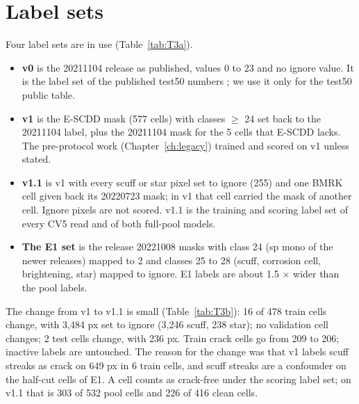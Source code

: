 
\section{Label sets}\label{sec:data-labels}

Four label sets are in use (Table~\ref{tab:T3a}).
\begin{itemize}
  \item \textbf{v0} is the 20211104 release as published, values 0 to 23 and no ignore value. It is the label set of the published
    test50 numbers \citep{pratt2023benchmark}; we use it only for the test50 public table.
  \item \textbf{v1} is the E-SCDD mask (577 cells) with classes $\geq$ 24 set back to the 20211104 label, plus the 20211104 mask for the 5
    cells that E-SCDD lacks. The pre-protocol work (Chapter~\ref{ch:legacy}) trained and scored on v1 unless stated.
  \item \textbf{v1.1} is v1 with every scuff or star pixel set to ignore (255) and one BMRK cell given back its 20220723 mask; in v1 that
    cell carried the mask of another cell. Ignore pixels are not scored. v1.1 is the training and scoring label set of every CV5 read
    and of both full-pool models.
  \item \textbf{The E1 set} is the release 20221008 masks with class 24 (sp mono of the newer releases) mapped to 2 and classes 25 to 28
    (scuff, corrosion cell, brightening, star) mapped to ignore. E1 labels are about 1.5 $\times$ wider than the pool labels.
\end{itemize}

The change from v1 to v1.1 is small (Table~\ref{tab:T3b}): 16 of 478 train cells change, with 3,484 px set to ignore (3,246 scuff,
238 star); no validation cell changes; 2 test cells change, with 236 px. Train crack cells go from 209 to 206; inactive labels are
untouched. The reason for the change was that v1 labels scuff streaks as crack on 649 px in 6 train cells, and scuff streaks are a
confounder on the half-cut cells of E1. A cell counts as crack-free under the scoring label set; on v1.1 that is 303 of 532
pool cells and 226 of 416 clean cells.

